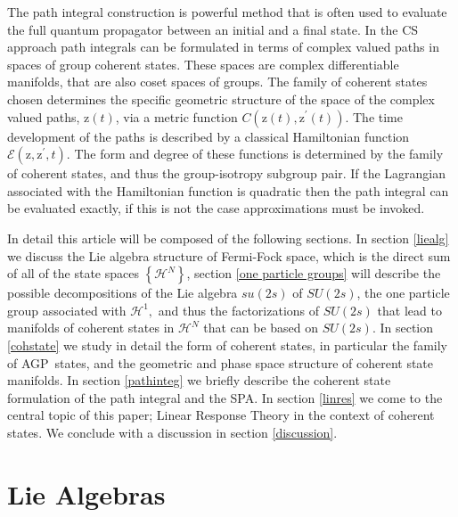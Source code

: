 \documentclass[aps,preprint]{revtex4}%
\begin{document}
The path integral construction is powerful method that is often used to
evaluate the full quantum propagator between an initial and a final state. In
the CS approach path integrals can be formulated in terms of complex valued
paths in spaces of group coherent states. These spaces are complex
differentiable manifolds, that are also coset spaces of groups. The family of
coherent states chosen determines the specific geometric structure of the
space of the complex valued paths, $\mathrm{z}(t)$, via a metric function
$C\left(  \mathrm{z}(t),\mathrm{z}^{\prime}(t)\right)  $. The time development
of the paths is described by a classical Hamiltonian function $\mathcal{E}%
\left(  \mathrm{z},\mathrm{z}^{\prime},t\right)  $. The form and degree of
these functions is determined by the family of coherent states, and thus the
group-isotropy subgroup pair. If the Lagrangian associated with the
Hamiltonian function is quadratic then the path integral can be evaluated
exactly, if this is not the case approximations must be invoked.

In detail this article will be composed of the following sections. In section
\ref{liealg} we discuss the Lie algebra structure of Fermi-Fock space, which
is the direct sum of all of the state spaces $\left\{  \mathcal{H}%
^{N}\right\}  $, section \ref{one particle groups} will describe the possible
decompositions of the Lie algebra $su\left(  2s\right)  $ of $SU(2s)$, the one
particle group associated with $\mathcal{H}^{1},$ and thus the factorizations
of $SU(2s)$ that lead to manifolds of coherent states in $\mathcal{H}^{N}$
that can be based on $SU(2s)$. In section \ref{cohstate} we study in detail
the form of coherent states, in particular the family of AGP\ states, and the
geometric and phase space structure of coherent state manifolds. In section
\ref{pathinteg} we briefly describe the coherent state formulation of the path
integral and the SPA. In section \ref{linres} we come to the central topic of
this paper; Linear Response Theory in the context of coherent states. We
conclude with a discussion in section \ref{discussion}.

\section{Lie Algebras\label{liealg}}
\end{document}
